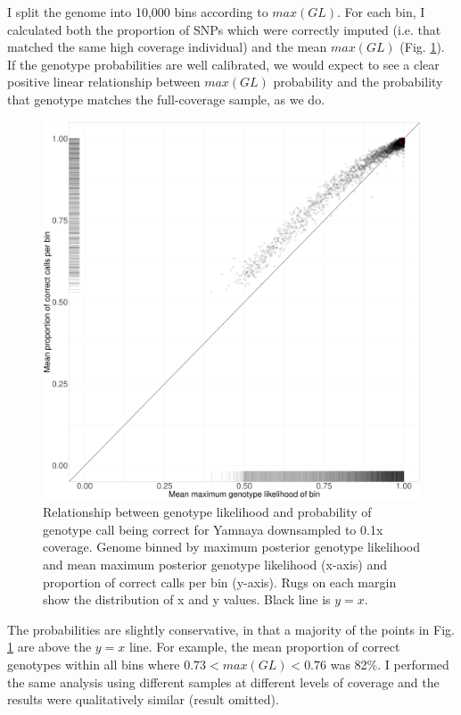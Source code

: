 I split the genome into 10,000 bins according to $max(GL)$. For each bin, I calculated both the proportion of SNPs which were correctly imputed (i.e. that matched the same high coverage individual) and the mean $max(GL)$ (Fig. \ref{fig:Yamnaya_0.1x_GL_calibration}). If the genotype probabilities are well calibrated, we would expect to see a clear positive linear relationship between $max(GL)$ probability and the probability that genotype matches the full-coverage sample, as we do.

\begin{figure}[htp]
    \centering
    \includegraphics[width=1.0\textwidth]{../images/chapter1/Yamnaya_0.1x_bin.pdf}
    \caption{Relationship between genotype likelihood and probability of genotype call being correct for Yamnaya downsampled to 0.1x coverage. Genome binned by maximum posterior genotype likelihood and mean maximum posterior genotype likelihood (x-axis) and proportion of correct calls per bin (y-axis). Rugs on each margin show the distribution of x and y values. Black line is $y=x$.}
    \label{fig:Yamnaya_0.1x_GL_calibration}
\end{figure}

The probabilities are slightly conservative, in that a majority of the points in Fig. \ref{fig:Yamnaya_0.1x_GL_calibration} are above the $y=x$ line. For example, the mean proportion of correct genotypes within all bins where $0.73 < max(GL) < 0.76$ was 82\%. I performed the same analysis using different samples at different levels of coverage and the results were qualitatively similar (result omitted).

